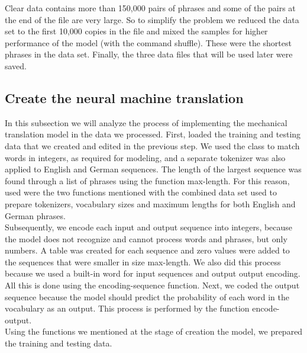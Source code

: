 ﻿\documentclass[conference]{IEEEtran}
\begin{document}
Clear data contains more than 150,000 pairs of phrases and some of the pairs at the end of the file are very large. So to simplify the problem we reduced the data set to the first 10,000 copies in the file and mixed the samples for higher performance of the model (with the command shuffle). These were the shortest phrases in the data set. Finally, the three data files that will be used later were saved.

\subsection{Create the neural machine translation}

In this subsection we will analyze the process of implementing the mechanical translation model in the data we processed. First, loaded the training and testing data that we created and edited in the previous step. We used the  class to match words in integers, as required for modeling, and a separate tokenizer was also applied to English and German sequences. The length of the largest sequence was found through a list of phrases using the function max-length. For this reason, used were the two functions mentioned with the combined data set used to prepare tokenizers, vocabulary sizes and maximum lengths for both English and German phrases. \\
Subsequently, we encode each input and output sequence into integers, because the model does not recognize and cannot process words and phrases, but only numbers. A table was created for each sequence and zero values were added to the sequences that were smaller in size max-length. We also did this process because we used a built-in word for input sequences and output output encoding. All this is done using the encoding-sequence function.
Next, we coded the output sequence because the model should predict the probability of each word in the vocabulary as an output. This process is performed by the function encode-output.\\
Using the functions we mentioned at the stage of creation the model, we prepared the training and testing data.\\
\end{document}
